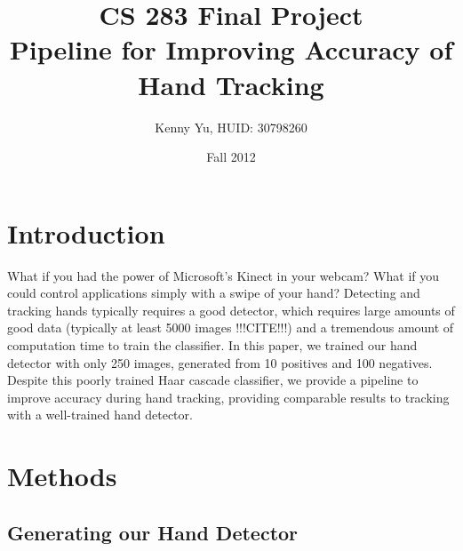 \documentclass[12pt]{article}
\begin{document}
\title{CS 283 Final Project \\ Pipeline for Improving Accuracy of Hand Tracking}
\date{Fall 2012}
\author{Kenny Yu, HUID: 30798260}

\maketitle

\section{Introduction}
What if you had the power of Microsoft's Kinect in your webcam? What if you could control applications simply with a swipe of your hand? Detecting and tracking hands typically requires a good detector, which requires large amounts of good data (typically at least 5000 images !!!CITE!!!) and a tremendous amount of computation time to train the classifier. In this paper, we trained our hand detector with only 250 images, generated from 10 positives and 100 negatives. Despite this poorly trained Haar cascade classifier, we provide a pipeline to improve accuracy during hand tracking, providing comparable results to tracking with a  well-trained hand detector.

\section{Methods}

\subsection{Generating our Hand Detector}
\end{document}
